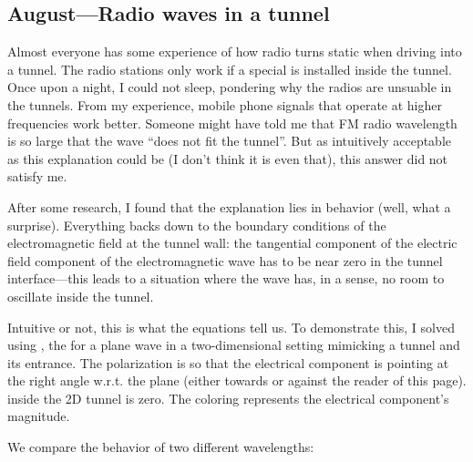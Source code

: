\documentclass{article}
\begin{document}
\subsection{August---Radio waves in a tunnel}

Almost everyone has some experience of how radio turns static when driving into a tunnel. The radio stations only work if a special   is installed inside the tunnel. Once upon a night, I could not sleep, pondering why the  radios are unsuable in the tunnels. From my experience, mobile phone signals that operate at higher frequencies work better. Someone might have told me that FM radio wavelength is so large that the wave ``does not fit the tunnel''. But as intuitively acceptable as this explanation could be (I don't think it is even that), this answer did not satisfy me.


After some research, I found that the explanation lies in  behavior (well, what a surprise). Everything backs down to the boundary conditions of the electromagnetic field at the tunnel wall: the tangential component of the electric field component of the electromagnetic wave has to be near zero in the tunnel interface---this leads to a situation where the wave has, in a sense, no room to oscillate inside the tunnel.


Intuitive or not, this is what the equations tell us. To demonstrate this, I solved using , the  for a plane wave in a two-dimensional setting mimicking a tunnel and its entrance. The  polarization is so that the electrical component is pointing at the right angle w.r.t. the plane (either towards or against the reader of this page).  inside the 2D tunnel is zero. The coloring represents the electrical component's magnitude.

We compare the behavior of two different wavelengths:
\end{document}
